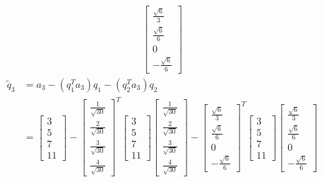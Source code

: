 \documentclass[english,onecolumn]{IEEEtran}
\begin{document}
\begin{enumerate}
\begin{align*}
\begin{bmatrix}
    \frac{\sqrt{6}}{3} \\
    \frac{\sqrt{6}}{6} \\
    0\\
    -\frac{\sqrt{6}}{6}
    \end{bmatrix}
    \end{align*}
    \begin{align*}
    	\tilde{q}_3 &= a_3-(q_1^Ta_3)q_1-(q_2^Ta_3)q_2\\
    	&=    \begin{bmatrix}
    3\\
    5\\
    7\\
    11
    \end{bmatrix}-\begin{bmatrix}
    \frac{1}{\sqrt{30}} \\
    \frac{2}{\sqrt{30}} \\
    \frac{3}{\sqrt{30}}\\
    \frac{4}{\sqrt{30}}
    \end{bmatrix}^T    \begin{bmatrix}
    3\\
    5\\
    7\\
    11
    \end{bmatrix}\begin{bmatrix}
    \frac{1}{\sqrt{30}} \\
    \frac{2}{\sqrt{30}} \\
    \frac{3}{\sqrt{30}}\\
    \frac{4}{\sqrt{30}}
    \end{bmatrix}-\begin{bmatrix}
    \frac{\sqrt{6}}{3} \\
    \frac{\sqrt{6}}{6} \\
    0\\
    -\frac{\sqrt{6}}{6}
    \end{bmatrix}^T    \begin{bmatrix}
    3\\
    5\\
    7\\
    11
    \end{bmatrix}\begin{bmatrix}
    \frac{\sqrt{6}}{3} \\
    \frac{\sqrt{6}}{6} \\
    0\\
    -\frac{\sqrt{6}}{6}
    \end{bmatrix}\\

\end{align*}
\end{enumerate}
\end{document}
